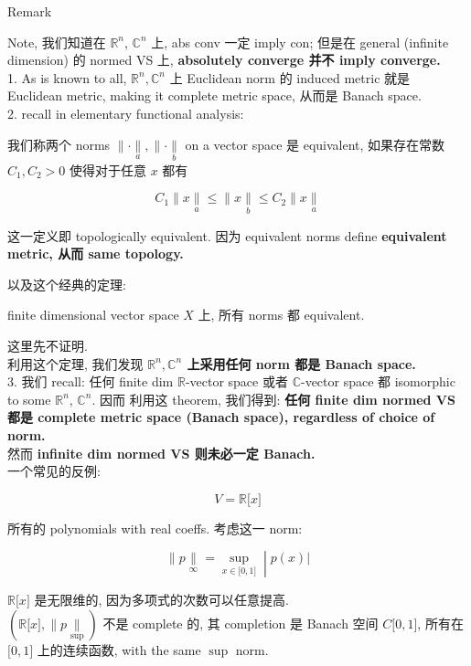 \begin{qlremark}{Remark}

Note, 我们知道在 \(\mathbb{R}^{n}\), \(\mathbb{C}^{n}\) 上, abs conv 一定 imply con; 但是在 general (infinite dimension) 的 normed VS 上, \textbf{absolutely converge 并不 imply converge.}\\
1. As is known to all, \(\mathbb{R}^{n},\mathbb{C}^{n}\) 上 Euclidean norm 的 induced metric 就是 Euclidean metric, making it complete metric space, 从而是 Banach space.\\
2. recall in elementary functional analysis:

\begin{definition}

我们称两个 norms \(\parallel \cdot \underset{a}{\parallel}, \parallel \cdot \underset{b}{\parallel}\) on a vector space 是 equivalent, 如果存在常数 \(C_{1},C_{2} > 0\) 使得对于任意 \(x\) 都有

\[C_{1} \parallel x\underset{a}{\parallel} \leq \parallel x\underset{b}{\parallel} \leq C_{2} \parallel x\underset{a}{\parallel}\]

这一定义即 topologically equivalent. 因为 equivalent norms define \textbf{equivalent metric, 从而 same topology.}

\end{definition}

以及这个经典的定理:

\begin{theorem}

finite dimensional vector space \(X\) 上, 所有 norms 都 equivalent.

\end{theorem}

这里先不证明.\\
利用这个定理, 我们发现 \textbf{\(\mathbb{R}^{n},\mathbb{C}^{n}\) 上采用任何 norm 都是 Banach space.}\\
3. 我们 recall: 任何 finite dim \(\mathbb{R}\)-vector space 或者 \(\mathbb{C}\)-vector space 都 isomorphic to some \(\mathbb{R}^{n}\), \(\mathbb{C}^{n}\). 因而 利用这 theorem, 我们得到: \textbf{任何 finite dim normed VS 都是 complete metric space (Banach space), regardless of choice of norm.}\\
然而 \textbf{infinite dim normed VS 则未必一定 Banach.}\\
一个常见的反例:

\[V = \mathbb{R}\lbrack x\rbrack\]

所有的 polynomials with real coeffs. 考虑这一 norm:

\[\left. \parallel p\underset{\infty}{\parallel} = \sup\limits_{x \in \lbrack 0,1\rbrack} \middle| p(x)| \right.\]

\(\mathbb{R}\lbrack x\rbrack\) 是无限维的, 因为多项式的次数可以任意提高.\\
\((\mathbb{R}\lbrack x\rbrack, \parallel p\underset{\sup}{\parallel})\) 不是 complete 的, 其 completion 是 Banach 空间 \(C\lbrack 0,1\rbrack\), 所有在 \(\lbrack 0,1\rbrack\) 上的连续函数, with the same \(\sup\) norm.\\

\end{qlremark}

